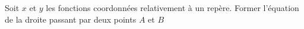 Soit $x$ et $y$ les fonctions coordonn{\'e}es relativement {\`a} un rep{\`e}re. Former l'{\'e}quation de la droite passant par deux points $A$ et $B$ \bigskip \bigskip \bigskip